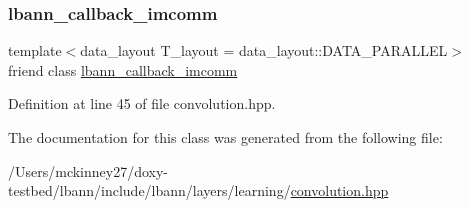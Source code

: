 \subsubsection{\texorpdfstring{lbann\+\_\+callback\+\_\+imcomm}{lbann\_callback\_imcomm}}
{\footnotesize\ttfamily template$<$data\+\_\+layout T\+\_\+layout = data\+\_\+layout\+::\+D\+A\+T\+A\+\_\+\+P\+A\+R\+A\+L\+L\+EL$>$ \\
friend class \hyperlink{classlbann_1_1lbann__callback__imcomm}{lbann\+\_\+callback\+\_\+imcomm}\hspace{0.3cm}{\ttfamily [friend]}}



Definition at line 45 of file convolution.\+hpp.



The documentation for this class was generated from the following file\+:\begin{DoxyCompactItemize}
\item 
/\+Users/mckinney27/doxy-\/testbed/lbann/include/lbann/layers/learning/\hyperlink{convolution_8hpp}{convolution.\+hpp}\end{DoxyCompactItemize}
